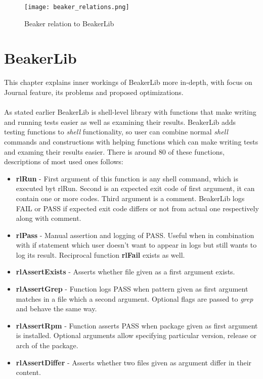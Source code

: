 \begin{figure}[h!]
  \texttt{[image: beaker\_relations.png]}
  \caption{Beaker relation to BeakerLib}
  \label{fig:beaker_relation}
\end{figure}




\chapter{BeakerLib}
This chapter explains inner workings of BeakerLib more in-depth, with focus on Journal feature, its problems and proposed optimizations.
\\
\\
As stated earlier BeakerLib is shell-level library with functions that make writing and running tests easier as well as examining their results.
BeakerLib adds testing functions to \textit{shell} functionality, so user can combine normal \textit{shell} commands and constructions with helping functions which can make writing tests and examing their results easier. There is around 80 of these functions, descriptions of most used ones follows:
\begin{itemize}
\item \textbf{rlRun} - First argument of this function is any shell command, which is executed byt rlRun. Second is an expected exit code of first argument, it can contain one or more codes. Third argument is a comment. BeakerLib logs FAIL or PASS if expected exit code differs or not from actual one respectively along with comment. 
\item \textbf{rlPass} - Manual assertion and logging of PASS. Useful when in combination with if statement which user doesn't want to appear in logs but still wants to log its result. Reciprocal function \textbf{rlFail} exists as well.
\item \textbf{rlAssertExists} - Asserts whether file given as a first argument exists.
\item \textbf{rlAssertGrep} - Function logs PASS when pattern given as first argument matches in a file which a second argument. Optional flags are passed to \textit{grep} and behave the same way.
\item \textbf{rlAssertRpm} - Function asserts PASS when package given as first argument is installed.  Optional arguments allow specifying particular version, release or arch of the package.
\item \textbf{rlAssertDiffer} - Asserts whether two files given as argument differ in their content. 
\end{itemize}
